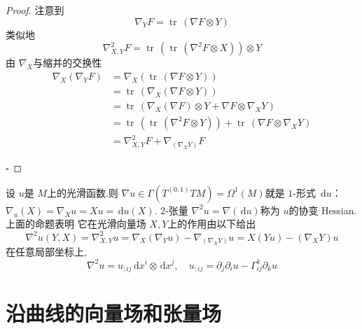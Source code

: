 \documentclass[../../几何与拓扑.tex]{subfiles}
\begin{document}
\begin{proof}
        注意到 \[
         \nabla _{Y}F =  \operatorname{tr}\,\left(  \nabla F\otimes Y \right) 
        \]类似地 \[
         \nabla _{X,Y}^{2}F =  \operatorname{tr}\,\left( \operatorname{tr}\,\left(  \nabla ^{2}F\otimes X \right)  \right)\otimes Y 
        \]由 \(   \nabla _{X}  \)与缩并的交换性 \[
        \begin{aligned}
         \nabla _{X}\left(  \nabla _{Y}F \right) & =    \nabla _{X} \left( \operatorname{tr}\,\left(  \nabla F\otimes Y \right)  \right)   \\ 
          & =  \operatorname{tr}\,\left(  \nabla _{X}\left(  \nabla F\otimes Y \right)  \right)\\ 
           & =  \operatorname{tr}\,\left(  \nabla _{X}\left(  \nabla F \right)\otimes Y +   \nabla F\otimes  \nabla _{X}Y  \right)  \\ 
            & =  \operatorname{tr}\,\left( \operatorname{tr}\,\left(  \nabla ^{2}F \otimes Y\right)  \right)+ \operatorname{tr}\,\left(  \nabla F\otimes  \nabla _{X}Y \right)  \\ 
             & =   \nabla _{X,Y}^{2}F +  \nabla _{\left(  \nabla _{X}Y \right) }F
        \end{aligned}
        \] 

    \hfill $\square$
\end{proof}

\begin{example}[协变Hessian]
    设 \(  u  \)是 \(  M  \)上的光滑函数.则 \(   \nabla u \in  \Gamma \left( T^{\left( 0,1 \right) }TM \right)=   \Omega ^{1}\left( M \right)    \)就是 \(  1  \)-形式 \(  \,\mathrm{d} u  \)：  \(   \nabla _{u}\left( X \right)=  \nabla _{X}u=  Xu= \,\mathrm{d} u\left( X \right)    \).
     \(  2  \)-张量 \(   \nabla ^{2}u=   \nabla \left( \,\mathrm{d} u \right)   \)称为 \(  u  \)的协变 Hessian.上面的命题表明 它在光滑向量场 \(  X,Y  \)上的作用由以下给出 \[
      \nabla ^{2}u\left( Y,X \right) =   \nabla _{X,Y}^{2}u=   \nabla _{X}\left(  \nabla _{Y}u \right)  - \nabla _{\left(  \nabla _{X}Y \right) }u =  X\left( Yu \right) -\left(  \nabla _{X}Y \right)u 
     \]      在任意局部坐标上, \[
      \nabla ^{2}u= u_{;ij}\,\mathrm{d} x^{i}\otimes \,\mathrm{d} x^{j},\quad  u_{;ij}= \partial _{j}\partial _{i}u - \Gamma _{ij}^{k}\partial _{k}u
     \]    
\end{example}

\hspace*{\fill} 

\section{沿曲线的向量场和张量场}
\end{document}
